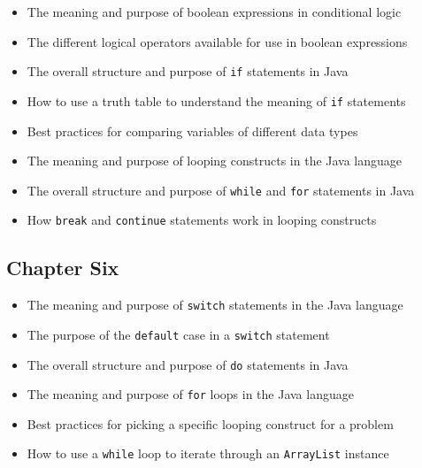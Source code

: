 \begin{itemize}

  \itemsep -.015in
  \item The meaning and purpose of boolean expressions in conditional logic
  \item The different logical operators available for use in boolean expressions
  \item The overall structure and purpose of {\tt if} statements in Java
  \item How to use a truth table to understand the meaning of {\tt if} statements
  \item Best practices for comparing variables of different data types
  \item The meaning and purpose of looping constructs in the Java language
  \item The overall structure and purpose of {\tt while} and {\tt for} statements in Java
  \item How {\tt break} and {\tt continue} statements work in looping constructs

\end{itemize}

\vspace*{-.15in}
\subsection*{Chapter Six}
\vspace*{-.1in}

\begin{itemize}

  \itemsep -.015in
  \item The meaning and purpose of {\tt switch} statements in the Java language
  \item The purpose of the {\tt default} case in a {\tt switch} statement
  \item The overall structure and purpose of {\tt do} statements in Java
  \item The meaning and purpose of {\tt for} loops in the Java language
  \item Best practices for picking a specific looping construct for a problem
  \item How to use a {\tt while} loop to iterate through an {\tt ArrayList} instance

\end{itemize}

